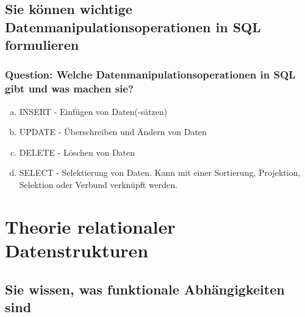 \documentclass{article}
\begin{document}
\begin{adjustwidth}{2em}{2em}
\begin{adjustwidth}{2em}{2em}
			\subsection{Sie können wichtige Datenmanipulationsoperationen in SQL formulieren}
			\begin{adjustwidth}{1em}{}
				\subsubsection*{Question: Welche Datenmanipulationsoperationen in SQL gibt und was machen sie?}
				\begin{adjustwidth}{1em}{}
					\begin{enumerate}[(a)]
						\item INSERT - Einfügen von Daten(-sätzen)
						\item UPDATE - Überschreiben und Ändern von Daten
						\item DELETE - Löschen von Daten
						\item SELECT - Selektierung von Daten. Kann mit einer Sortierung, Projektion, Selektion oder Verbund verknüpft werden.
					\end{enumerate}
				\end{adjustwidth}
			\end{adjustwidth}
		\end{adjustwidth}
		
		\newpage
			
		\section{Theorie relationaler Datenstrukturen}
		\begin{adjustwidth}{2em}{2em}
			\subsection{Sie wissen, was funktionale Abhängigkeiten sind}
			\begin{adjustwidth}{1em}{}

\end{adjustwidth}
\end{adjustwidth}
\end{adjustwidth}
\end{document}

